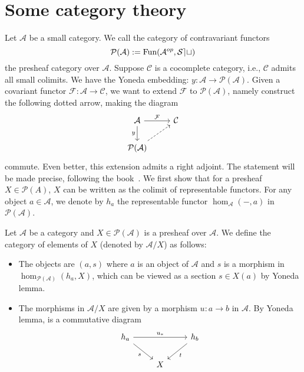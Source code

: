 \chapter{Some category theory}\label{AppenA}
Let \(\mathcal{A}\) be a small category. We call the category of contravariant functors
\[\mathcal{P}(\mathcal{A}):=\text{Fun}(\mathcal{A}^{op},\mathcal{Set})\]
the presheaf category over \(\mathcal{A}\). Suppose \(\mathcal{C}\) is a cocomplete category, i.e., \(\mathcal{C}\) admits all small colimits. We have the Yoneda embedding: \(y:\mathcal{A}\rightarrow \mathcal{P}(\mathcal{A})\). Given a covariant functor \(\mathcal{F}:\mathcal{A}\rightarrow \mathcal{C}\), we want to extend \(\mathcal{F}\) to \(\mathcal{P}(\mathcal{A})\), namely construct the following dotted arrow, making the diagram 
\[\begin{tikzcd}
    {\mathcal{A}} & {\mathcal{C}} \\
    {\mathcal{P}(\mathcal{A})}
    \arrow["{\mathcal{F}}", from=1-1, to=1-2]
    \arrow["y"', from=1-1, to=2-1]
    \arrow[dashed, from=2-1, to=1-2]
  \end{tikzcd}\]
commute. Even better, this extension admits a right adjoint. The statement will be made precise, following the book~\cite{cisinskiHigherCategoriesHomotopical2019}. We first show that for a presheaf \(X\in \mathcal{P}(A)\), \(X\) can be written as the colimit of representable functors. For any object \(a\in \mathcal{A}\), we denote by \(h_a\) the representable functor \(\hom_{\mathcal{A}}(-,a)\) in \(\mathcal{P}(\mathcal{A})\).
\begin{definition}
     Let \(\mathcal{A}\) be a category and \(X\in \mathcal{P}(\mathcal{A})\) is a presheaf over \(\mathcal{A}\). We define the category of elements of \(X\) (denoted by \(\mathcal{A}/X\)) as follows:
     \begin{itemize}
      \item The objects are \((a,s)\) where \(a\) is an object of \(\mathcal{A}\) and \(s\) is a morphism in \(\hom_{\mathcal{P}(\mathcal{A})}(h_a,X)\), which can be viewed as a section \(s\in X(a)\) by Yoneda lemma.
      \item The morphisms in \(\mathcal{A}/X\) are given by a morphism \(u:a\rightarrow b\) in \(\mathcal{A}\). By Yoneda lemma, is a commutative diagram 
      \[\begin{tikzcd}
          {h_a} && {h_b} \\
          & X
          \arrow["{u_*}", from=1-1, to=1-3]
          \arrow["s"', from=1-1, to=2-2]
          \arrow["t", from=1-3, to=2-2]
        \end{tikzcd}\]
     \end{itemize}
\end{definition}

